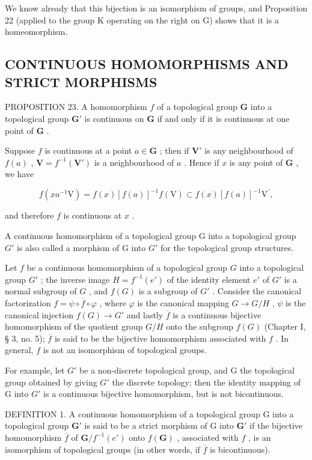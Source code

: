 We know already that this bijection is an isomorphism of groups, and Proposition 22 (applied to the group K operating on the right on G) shows that it is a homeomorphism.

\subsection{CONTINUOUS HOMOMORPHISMS AND STRICT MORPHISMS}

PROPOSITION 23. A homomorphism \(f\) of a topological group \(\mathbf{G}\) into a topological group \(\mathbf{G}'\) is continuous on \(\mathbf{G}\) if and only if it is continuous at one point of \(\mathbf{G}\) .

Suppose \(f\) is continuous at a point \(a \in \mathbf{G}\) ; then if \(\mathbf{V}'\) is any neighbourhood of \(f(a)\) , \(\mathbf{V} = f^{-1}(\mathbf{V}')\) is a neighbourhood of \(a\) . Hence if \(x\) is any point of \(\mathbf{G}\) , we have

\[
f (x a ^ {- 1} \mathrm{V}) = f (x) [ f (a) ] ^ {- 1} f (\mathrm{V}) \subset f (x) [ f (a) ] ^ {- 1} \mathrm{V} ^ {\prime},
\]

and therefore \(f\) is continuous at \(x\) .

A continuous homomorphism of a topological group G into a topological group \(G'\) is also called a morphism of G into \(G'\) for the topological group structures.

Let \(f\) be a continuous homomorphism of a topological group \(G\) into a topological group \(G'\) ; the inverse image \(H = f^{-1}(e')\) of the identity element \(e'\) of \(G'\) is a normal subgroup of \(G\) , and \(f(G)\) is a subgroup of \(G'\) . Consider the canonical factorization \(f = \psi \circ \overline{f} \circ \varphi\) , where \(\varphi\) is the canonical mapping \(G \to G/H\) , \(\psi\) is the canonical injection \(f(G) \to G'\) and lastly \(\overline{f}\) is a continuous bijective homomorphism of the quotient group \(G/H\) onto the subgroup \(f(G)\) (Chapter I, § 3, no. 5); \(\overline{f}\) is said to be the bijective homomorphism associated with \(f\) . In general, \(f\) is not an isomorphism of topological groups.

For example, let \(G'\) be a non-discrete topological group, and G the topological group obtained by giving \(G'\) the discrete topology; then the identity mapping of G into \(G'\) is a continuous bijective homomorphism, but is not bicontinuous.

DEFINITION 1. A continuous homomorphism of a topological group G into a topological group \(\mathbf{G}'\) is said to be a strict morphism of G into \(\mathbf{G}'\) if the bijective homomorphism \(\overline{f}\) of \(\mathbf{G}/f^{-1}(e')\) onto \(f(\mathbf{G})\) , associated with \(f\) , is an isomorphism of topological groups (in other words, if \(\overline{f}\) is bicontinuous).

